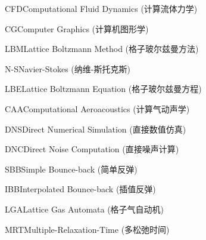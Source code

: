 
\begin{nomenclatures}[缩写]
  \item{CFD}{Computational Fluid Dynamics (计算流体力学)}
  \item{CG}{Computer Graphics (计算机图形学)}
  \item{LBM}{Lattice Boltzmann Method (格子玻尔兹曼方法)}
  \item{N-S}{Navier-Stokes (纳维-斯托克斯)}
  \item{LBE}{Lattice Boltzmann Equation (格子玻尔兹曼方程)}
  \item{CAA}{Computational Aeroacoustics (计算气动声学)}
  \item{DNS}{Direct Numerical Simulation (直接数值仿真)}
  \item{DNC}{Direct Noise Computation (直接噪声计算)}
  \item{SBB}{Simple Bounce-back (简单反弹)}
  \item{IBB}{Interpolated Bounce-back (插值反弹)}
  \item{LGA}{Lattice Gas Automata (格子气自动机)}
  \item{MRT}{Multiple-Relaxation-Time (多松弛时间)}
\end{nomenclatures}

